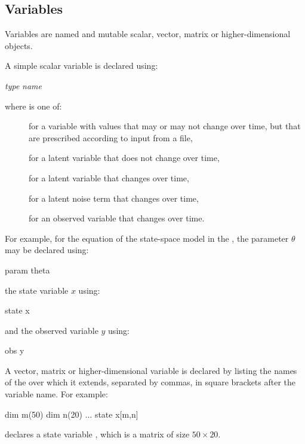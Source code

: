 \subsection{Variables\label{Variables}}

 Variables are named and mutable
scalar, vector, matrix or
higher-dimensional objects.

A simple scalar variable is declared using:
\begin{bicode}
\emph{type} \emph{name}
\end{bicode}
where  is one of:
\begin{description}
\item[] for a variable with values that may or may
  not change over time, but that are prescribed according to input from a
  file,
\item[] for a latent variable that does not change over time,
\item[] for a latent variable that changes over time,
\item[] for a latent noise term that changes over time,
\item[] for an observed variable that changes over time.
\end{description}
For example, for the equation of the state-space model in the
, the parameter $\theta$ may be declared
using:
\begin{bicode}
param theta
\end{bicode}
the state variable $x$ using:
\begin{bicode}
state x
\end{bicode}
and the observed variable $y$ using:
\begin{bicode}
obs y
\end{bicode}

A vector, matrix or
higher-dimensional variable is declared by listing
the names of the  over which it extends,
separated by commas, in square brackets after the variable name. For example:
\begin{bicode}
dim m(50)
dim n(20)
...
state x[m,n]
\end{bicode}
declares a state variable , which is a matrix of size
$50 \times 20$.

